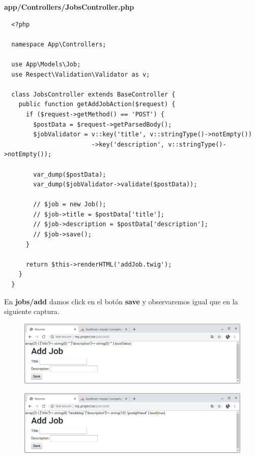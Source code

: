 \documentclass{article}
\begin{document}
\textbf{app/Controllers/JobsController.php}
\begin{verbatim}
  <?php

  namespace App\Controllers;

  use App\Models\Job;
  use Respect\Validation\Validator as v;

  class JobsController extends BaseController {
    public function getAddJobAction($request) {
      if ($request->getMethod() == 'POST') {
        $postData = $request->getParsedBody();
        $jobValidator = v::key('title', v::stringType()->notEmpty())
                        ->key('description', v::stringType()->notEmpty());

        var_dump($postData);
        var_dump($jobValidator->validate($postData));

        // $job = new Job();
        // $job->title = $postData['title'];
        // $job->description = $postData['description'];
        // $job->save();
      }

      return $this->renderHTML('addJob.twig');
    }
  }
\end{verbatim}

En \textbf{jobs/add} damos click en el botón \textbf{save} y observaremos igual
que en la siguiente captura.\\

\begin{figure}[h!]
  \centering
  \includegraphics[scale=0.5]{./Pictures/164_validateEmpty.png}
\end{figure}

\begin{figure}[h!]
  \centering
  \includegraphics[scale=0.5]{./Pictures/165_validateEmpty.png}
\end{figure}
\end{document}
